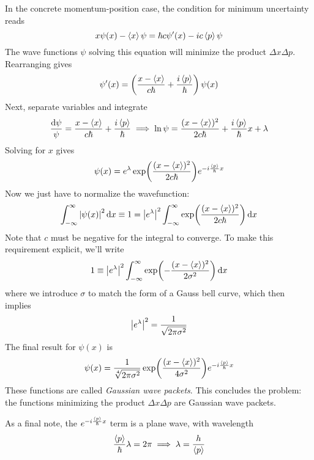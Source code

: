 \documentclass[11pt, a4paper]{article}
\newcommand{\diff}{\mathop{}\!\mathrm{d}} %
\begin{document}
\begin{itemize}
	In the concrete momentum-position case, the condition for minimum uncertainty reads
	\begin{equation*}
		x \psi(x) - \expval{x} \psi = \hbar c \psi'(x) - ic \expval{p} \psi
	\end{equation*}
	The wave functions $ \psi $ solving this equation will minimize the product $ \Delta x \Delta p $. Rearranging gives
	\begin{equation*}
		\psi'(x) = \left(\frac{x - \ev{x}}{c\hbar} + \frac{i\ev{p}}{\hbar}\right)\psi(x)
	\end{equation*}
	Next, separate variables and integrate
	\begin{equation*}
		\frac{\diff \psi}{\psi} = \frac{x - \ev{x}}{c \hbar} + \frac{i\ev{p}}{\hbar} \implies \ln \psi = \frac{(x - \ev{x})^{2}}{2c \hbar} + \frac{i\ev{p}}{\hbar}x + \lambda
	\end{equation*}
	Solving for $ x $ gives
	\begin{equation*}
		\psi(x) = e^{\lambda}\exp(\frac{(x - \ev{x})^{2}}{2c\hbar})e^{-i\frac{\ev{p}}{\hbar}x}
	\end{equation*}
	Now we just have to normalize the wavefunction:
	\begin{equation*}
		\int_{-\infty}^{\infty} \abs{\psi(x)}^{2} \diff x \equiv 1 = \abs{e^{\lambda}}^{2} \int_{-\infty}^{\infty}\exp(\frac{(x - \ev{x})^{2}}{2c\hbar})\diff x
	\end{equation*}
	Note that $ c $ must be negative for the integral to converge. To make this requirement explicit, we'll write
	\begin{equation*}
		1 \equiv  \abs{e^{\lambda}}^{2} \int_{-\infty}^{\infty}\exp(-\frac{(x - \ev{x})^{2}}{2\sigma^{2}})\diff x
	\end{equation*}
	where we introduce $ \sigma $ to match the form of a Gauss bell curve, which then implies
	\begin{equation*}
		\abs{e^{\lambda}}^{2} = \frac{1}{\sqrt{2\pi \sigma^{2}}}
	\end{equation*}
	The final result for $ \psi(x) $ is
	\begin{equation*}
		\psi(x) = \frac{1}{\sqrt[4]{2\pi \sigma^{2}}} \exp(\frac{(x - \ev{x})^{2}}{4 \sigma^{2}})e^{-i\frac{\ev{p}}{\hbar}x}
	\end{equation*}
	These functions are called \textit{Gaussian wave packets}. This concludes the problem: the functions minimizing the product $ \Delta x \Delta p $ are Gaussian wave packets. 
	
	As a final note, the $ e^{-i\frac{\ev{p}}{\hbar}x} $ term is a plane wave, with wavelength
	\begin{equation*}
		\frac{\ev{p}}{\hbar} \lambda = 2\pi \implies \lambda = \frac{h}{\ev{p}}
	\end{equation*}
	
\end{itemize}
\end{document}
